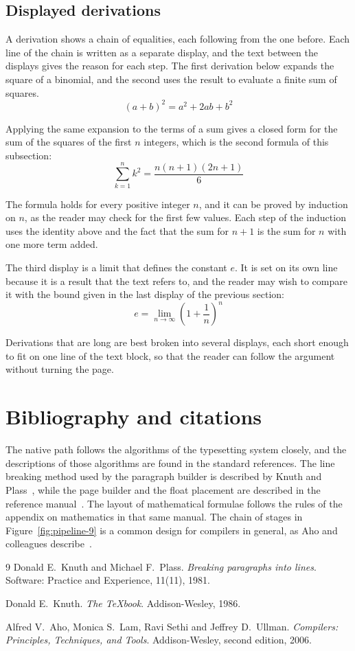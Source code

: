 \documentclass{article}
\begin{document}
\subsection{Displayed derivations}\label{sec:derivations-9}

A derivation shows a chain of equalities, each following from the one before. Each line
of the chain is written as a separate display, and the text between the displays gives
the reason for each step. The first derivation below expands the square of a binomial,
and the second uses the result to evaluate a finite sum of squares.
\[
  (a+b)^{2} = a^{2} + 2ab + b^{2}
\]

Applying the same expansion to the terms of a sum gives a closed form for the sum of the
squares of the first $n$ integers, which is the second formula of this subsection:
\[
  \sum_{k=1}^{n} k^{2} = \frac{n(n+1)(2n+1)}{6}
\]

The formula holds for every positive integer $n$, and it can be proved by induction on
$n$, as the reader may check for the first few values. Each step of the induction
uses the identity above and the fact that the sum for $n+1$ is the sum for $n$ with one
more term added.

The third display is a limit that defines the constant $e$. It is set on its own line
because it is a result that the text refers to, and the reader may wish to compare it
with the bound given in the last display of the previous section:
\[
  e = \lim_{n\to\infty} \left( 1 + \frac{1}{n} \right)^{n}
\]

Derivations that are long are best broken into several displays, each short enough to
fit on one line of the text block, so that the reader can follow the argument without
turning the page.

\section{Bibliography and citations}\label{sec:refs-9}

The native path follows the algorithms of the typesetting system closely, and the
descriptions of those algorithms are found in the standard references. The line
breaking method used by the paragraph builder is described by Knuth and
Plass~\cite{knuth81-9}, while the page builder and the float placement are described in
the reference manual~\cite{knuth86-9}. The layout of mathematical formulae follows the
rules of the appendix on mathematics in that same manual. The chain of stages in
Figure~\ref{fig:pipeline-9} is a common design for compilers in general, as Aho and
colleagues describe~\cite{aho06-9}.

\begin{thebibliography}{9}
  Donald E.~Knuth and Michael F.~Plass.
  \emph{Breaking paragraphs into lines}.
  Software: Practice and Experience, 11(11), 1981.

  Donald E.~Knuth.
  \emph{The \TeX book}.
  Addison-Wesley, 1986.

  Alfred V.~Aho, Monica S.~Lam, Ravi Sethi and Jeffrey D.~Ullman.
  \emph{Compilers: Principles, Techniques, and Tools}.
  Addison-Wesley, second edition, 2006.
\end{thebibliography}
\end{document}
